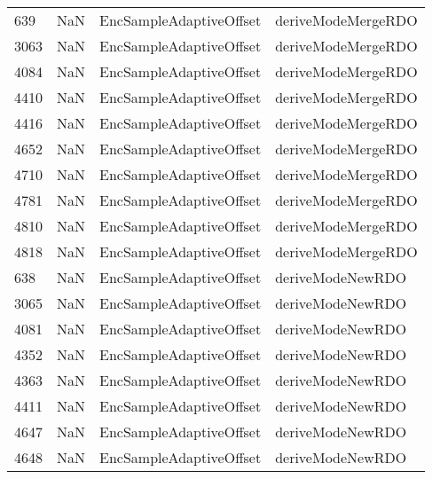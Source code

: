 \begin{tabular}{llll}
639  &                   NaN &    EncSampleAdaptiveOffset &                        deriveModeMergeRDO \\
3063 &                   NaN &    EncSampleAdaptiveOffset &                        deriveModeMergeRDO \\
4084 &                   NaN &    EncSampleAdaptiveOffset &                        deriveModeMergeRDO \\
4410 &                   NaN &    EncSampleAdaptiveOffset &                        deriveModeMergeRDO \\
4416 &                   NaN &    EncSampleAdaptiveOffset &                        deriveModeMergeRDO \\
4652 &                   NaN &    EncSampleAdaptiveOffset &                        deriveModeMergeRDO \\
4710 &                   NaN &    EncSampleAdaptiveOffset &                        deriveModeMergeRDO \\
4781 &                   NaN &    EncSampleAdaptiveOffset &                        deriveModeMergeRDO \\
4810 &                   NaN &    EncSampleAdaptiveOffset &                        deriveModeMergeRDO \\
4818 &                   NaN &    EncSampleAdaptiveOffset &                        deriveModeMergeRDO \\
638  &                   NaN &    EncSampleAdaptiveOffset &                          deriveModeNewRDO \\
3065 &                   NaN &    EncSampleAdaptiveOffset &                          deriveModeNewRDO \\
4081 &                   NaN &    EncSampleAdaptiveOffset &                          deriveModeNewRDO \\
4352 &                   NaN &    EncSampleAdaptiveOffset &                          deriveModeNewRDO \\
4363 &                   NaN &    EncSampleAdaptiveOffset &                          deriveModeNewRDO \\
4411 &                   NaN &    EncSampleAdaptiveOffset &                          deriveModeNewRDO \\
4647 &                   NaN &    EncSampleAdaptiveOffset &                          deriveModeNewRDO \\
4648 &                   NaN &    EncSampleAdaptiveOffset &                          deriveModeNewRDO \\

\end{tabular}
